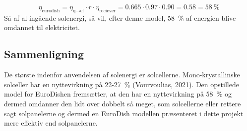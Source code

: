 \documentclass[SRC.tex]{subfiles}
\begin{document}
	\begin{equation}
		\eta_{\text{eurodish}} = \eta_{\text{q}\rightarrow\text{el}} \cdot r \cdot \eta_{\text{reciever}}  = 0.665 \cdot 0.97 \cdot 0.90 = 0.58 = \SI{58}{\percent}
		\label{eq:nyt}
	\end{equation} 
	Så af al ingående solenergi, så vil, efter denne model, \SI{58}{\percent} af energien blive omdannet til elektricitet. 
	\subsection{Sammenligning}
	De største indenfor anvendelsen af solenergi er solcellerne. Mono-krystallinske solceller har en nyttevirkning på 22-\SI{27}{\percent} (Vourvoulias, 2021).
	Den opstillede model for EuroDishen fremsætter, at den har en nyttevirkning på \SI{58}{\percent} 
	og dermed omdanner den lidt over dobbelt så meget, som solcellerne eller rettere sagt solpanelerne og dermed en EuroDish modellen præsenteret i dette projekt mere effektiv end solpanelerne. 
\end{document}
